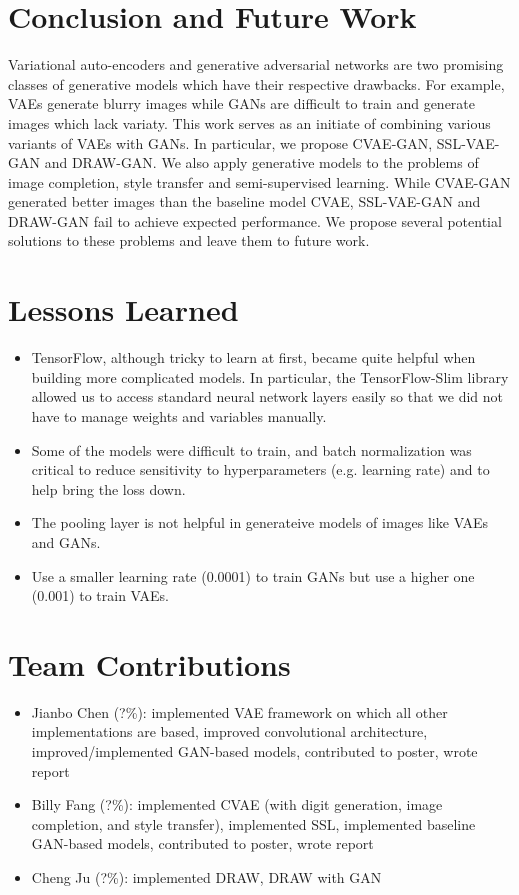 \documentclass[10pt]{article}
\begin{document}
\section{Conclusion and Future Work}
Variational auto-encoders and generative adversarial networks are two promising classes of generative models which have their respective drawbacks. For example, VAEs generate blurry images while GANs are difficult to train and generate images which lack variaty. This work serves as an initiate of combining various variants of VAEs with GANs. In particular, we propose CVAE-GAN, SSL-VAE-GAN and DRAW-GAN. We also apply generative models to the problems of image completion, style transfer and semi-supervised learning. While CVAE-GAN generated better images than the baseline model CVAE, SSL-VAE-GAN and DRAW-GAN fail to achieve expected performance. We propose several potential solutions to these problems and leave them to future work.
\section{Lessons Learned}
\begin{itemize}
\item TensorFlow, although tricky to learn at first, became quite helpful when building more complicated models. In particular, the TensorFlow-Slim library allowed us to access standard neural network layers easily so that we did not have to manage weights and variables manually.

\item Some of the models were difficult to train, and batch normalization was critical to reduce sensitivity to hyperparameters (e.g. learning rate) and to help bring the loss down.
\item The pooling layer is not helpful in generateive models of images like VAEs and GANs.
\item Use a smaller learning rate (0.0001) to train GANs but use a higher one (0.001) to train VAEs.
\end{itemize}
\section{Team Contributions}

\begin{itemize}
\item Jianbo Chen (?\%): implemented VAE framework on which all other implementations are based, improved convolutional architecture, improved/implemented GAN-based models, contributed to poster, wrote report
\item Billy Fang (?\%): implemented CVAE (with digit generation, image completion, and style transfer), implemented SSL, implemented baseline GAN-based models, contributed to poster, wrote report
\item Cheng Ju (?\%): implemented DRAW, DRAW with GAN
\end{itemize}















\nocite{*}
\end{document}
